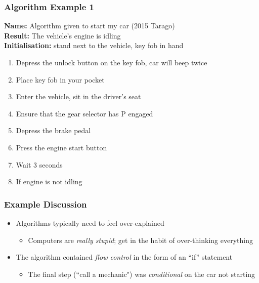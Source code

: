\documentclass[14pt]{beamer}
\begin{document}
\begin{frame}[fragile] %

\frametitle{Algorithm Example 1}
{\footnotesize
\textbf{Name:} Algorithm given to start my car (2015 Tarago) \\
\textbf{Result:} The vehicle's engine is idling \\
\textbf{Initialisation:} stand next to the vehicle, key fob in hand 
\begin{enumerate}
\setlength{\itemsep}{1pt}
  \setlength{\parskip}{0pt}
  \setlength{\parsep}{0pt}
\item Depress the unlock button on the key fob, car will beep twice
\item Place key fob in your pocket
\item Enter the vehicle, sit in the driver's seat
\item Ensure that the gear selector has P engaged
\item Depress the brake pedal
\item Press the engine start button
\item Wait 3 seconds
\item If engine is not idling
	\begin{itemize}
		\footnotesize{
		\item Call a mechanic}
	\end{itemize}
\end{enumerate}
}
\end{frame}

\begin{frame} %
\frametitle{Example Discussion}
\begin{itemize}
\item Algorithms typically need to feel over-explained
	\begin{itemize}
		\item Computers are \textit{really stupid}; get in the habit of over-thinking everything
	\end{itemize}
\item The algorithm contained \textit{flow control} in the form of an ``if'' statement
	\begin{itemize}
		\item The final step (``call a mechanic") was \textit{conditional} on the car not starting
	\end{itemize}
\end{itemize}
\end{frame}
\end{document}
